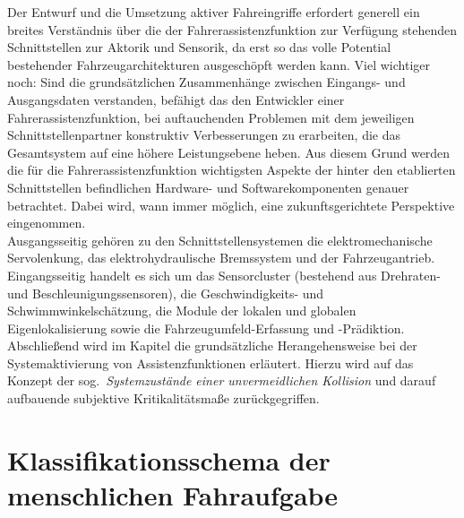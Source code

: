 Der Entwurf und die Umsetzung aktiver Fahreingriffe erfordert generell ein breites Verständnis über die der Fahrerassistenzfunktion zur Verfügung stehenden Schnittstellen zur Aktorik und Sensorik, da erst so das volle Potential bestehender Fahrzeugarchitekturen ausgeschöpft werden kann. Viel wichtiger noch: Sind die grundsätzlichen Zusammenhänge zwischen Eingangs- und Ausgangsdaten verstanden, befähigt das den Entwickler einer Fahrerassistenzfunktion, bei auftauchenden Problemen mit dem jeweiligen Schnittstellenpartner konstruktiv Verbesserungen zu erarbeiten, die das Gesamtsystem auf eine höhere Leistungsebene heben. Aus diesem Grund werden die für die Fahrerassistenzfunktion wichtigsten Aspekte der hinter den etablierten Schnittstellen befindlichen Hardware- und Softwarekomponenten genauer betrachtet. Dabei wird, wann immer möglich, eine zukunftsgerichtete Perspektive eingenommen. \\ %
%
Ausgangsseitig gehören zu den Schnittstellensystemen die elektromechanische Servolenkung, das elektrohydraulische Bremssystem und der Fahrzeugantrieb. Eingangsseitig handelt es sich um das Sensorcluster (bestehend aus Drehraten- und Beschleunigungssensoren), die Geschwindigkeits- und Schwimmwinkelschätzung, die Module der lokalen und globalen Eigenlokalisierung sowie die Fahrzeugumfeld-Erfassung und -Prädiktion. \\
Abschließend wird im Kapitel die grundsätzliche Herangehensweise bei der Systemaktivierung von Assistenzfunktionen erläutert. Hierzu wird auf das Konzept der sog.\ \emph{Systemzustände einer unvermeidlichen Kollision} und darauf aufbauende subjektive Kritikalitätsmaße zurückgegriffen.
	
	
%






\section{Klassifikationsschema der menschlichen Fahraufgabe}

